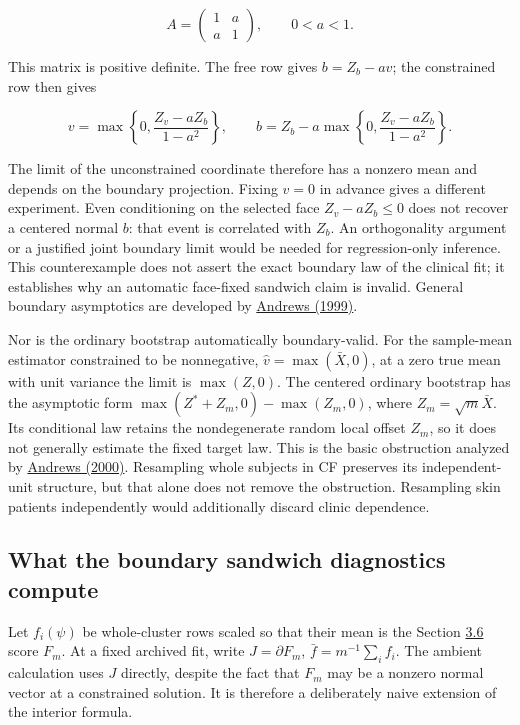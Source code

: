 \documentclass[11pt]{article}
\begin{document}
\begin{equation*}
A=\begin{pmatrix}1&a\\a&1\end{pmatrix},\qquad 0<a<1.
\end{equation*}

This matrix is positive definite. The free row gives \(b=Z_b-av\); the constrained row then gives

\begin{equation*}
v=\max\left\{0,\frac{Z_v-aZ_b}{1-a^2}\right\},\qquad
b=Z_b-a\max\left\{0,\frac{Z_v-aZ_b}{1-a^2}\right\}.
\end{equation*}

The limit of the unconstrained coordinate therefore has a nonzero mean and depends on the boundary projection. Fixing \(v=0\) in advance gives a different experiment. Even conditioning on the selected face \(Z_v-aZ_b\leq0\) does not recover a centered normal \(b\): that event is correlated with \(Z_b\). An orthogonality argument or a justified joint boundary limit would be needed for regression-only inference. This counterexample does not assert the exact boundary law of the clinical fit; it establishes why an automatic face-fixed sandwich claim is invalid. General boundary asymptotics are developed by \href{https://doi.org/10.1111/1468-0262.00082}{Andrews (1999)}.

Nor is the ordinary bootstrap automatically boundary-valid. For the sample-mean estimator constrained to be nonnegative, \(\widehat v=\max(\bar X,0)\), at a zero true mean with unit variance the limit is \(\max(Z,0)\). The centered ordinary bootstrap has the asymptotic form \(\max(Z^*+Z_m,0)-\max(Z_m,0)\), where \(Z_m=\sqrt m\bar X\). Its conditional law retains the nondegenerate random local offset \(Z_m\), so it does not generally estimate the fixed target law. This is the basic obstruction analyzed by \href{https://doi.org/10.1111/1468-0262.00114}{Andrews (2000)}. Resampling whole subjects in CF preserves its independent-unit structure, but that alone does not remove the obstruction. Resampling skin patients independently would additionally discard clinic dependence.

\subsection{What the boundary sandwich diagnostics compute}\label{sec:L.2}

Let \(f_i(\psi)\) be whole-cluster rows scaled so that their mean is the Section \hyperref[sec:3.6]{3.6} score \(F_m\). At a fixed archived fit, write \(J=\partial F_m\), \(\bar f=m^{-1}\sum_i f_i\). The ambient calculation uses \(J\) directly, despite the fact that \(F_m\) may be a nonzero normal vector at a constrained solution. It is therefore a deliberately naive extension of the interior formula.
\end{document}
